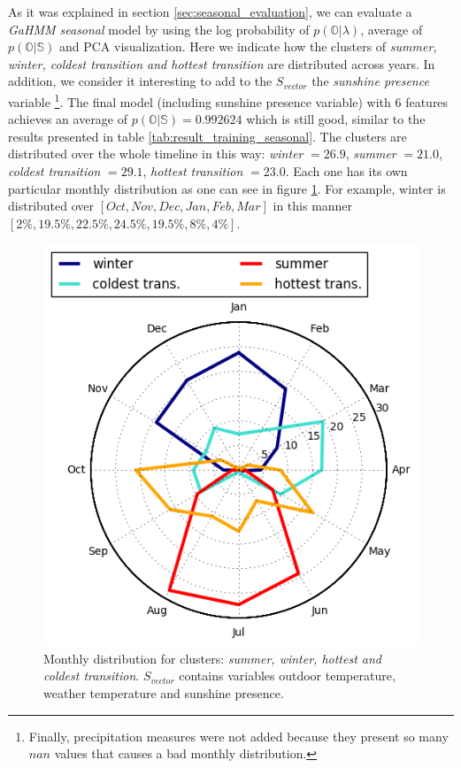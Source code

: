 As it was explained in section \ref{sec:seasonal_evaluation}, we can evaluate a \textit{GaHMM seasonal} model by using the log probability of $p(\mathbb{O}|\lambda)$, average of $p(\mathbb{O}|\mathbb{S})$ and PCA visualization. 
Here we indicate how the clusters of \textit{summer, winter, coldest transition and hottest transition} are distributed across years. In addition, we consider it interesting to add to the $S_{vector}$ the \textit{sunshine presence} variable \footnote{Finally, precipitation measures were not added because they present so many $nan$ values that causes a bad monthly distribution.}. The final model (including sunshine presence variable) with 6 features achieves an average of $p(\mathbb{O}|\mathbb{S}) = 0.992624$ which is still good, similar to the results presented in table \ref{tab:result_training_seasonal}. The clusters are distributed over the whole timeline in this way: \textit{winter} $= 26.9$, \textit{summer} $=21.0$, \textit{coldest transition} $=29.1$, \textit{hottest transition} $=23.0$. Each one has its own particular monthly distribution as one can see in figure \ref{fig:monthly}. For example, winter is distributed over $[Oct, Nov, Dec, Jan, Feb, Mar]$ in this manner $[2\%, 19.5\%, 22.5\%, 24.5\%, 19.5\%, 8\%, 4\%]$.   


\begin{figure}[h!]
  \vspace{0.5em} %
  \includegraphics[scale=0.65]{Figures/Monthly_distribution.jpg}
  \caption{Monthly distribution for clusters: \textit{summer, winter, hottest and coldest transition}. $S_{vector}$ contains variables outdoor temperature, weather temperature and sunshine presence.}
  \label{fig:monthly}
\end{figure} 


